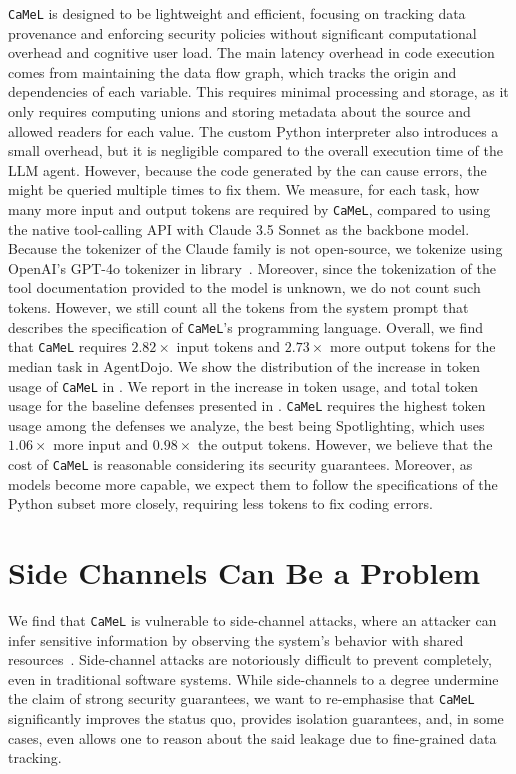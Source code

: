 \documentclass[11pt, a4paper, logo, copyright]{googledeepmind}
\newcommand{\sysname}{\texttt{CaMeL}\xspace}
\begin{document}
\sysname{} is designed to be lightweight and efficient, focusing on tracking data provenance and enforcing security policies without significant computational overhead and cognitive user load. The main latency overhead in code execution comes from maintaining the data flow graph, which tracks the origin and dependencies of each variable. This requires minimal processing and storage, as it only requires computing unions and storing metadata about the source and allowed readers for each value. The custom Python interpreter also introduces a small overhead, but it is negligible compared to the overall execution time of the LLM agent. However, because the code generated by the \pllm can cause errors, the \pllm might be queried multiple times to fix them. We measure, for each task, how many more input and output tokens are required by \sysname, compared to using the native tool-calling API with Claude 3.5 Sonnet as the backbone model. Because the tokenizer of the Claude family is not open-source, we tokenize using OpenAI's GPT-4o tokenizer in  library~\citep{tiktoken2022}.
Moreover, since the tokenization of the tool documentation provided to the model is unknown, we do not count such tokens. However, we still count all the tokens from the system prompt that describes the specification of \sysname's programming language. Overall, we find that \sysname requires $2.82\times$ input tokens and $2.73\times$ more output tokens for the median task in AgentDojo. We show the distribution of the increase in token usage of \sysname in . We report in  the increase in token usage, and total token usage for the baseline defenses presented in .
\sysname requires the highest token usage among the defenses we analyze, the best being Spotlighting, which uses $1.06\times$ more input and $0.98\times$ the output tokens. However, we believe that the cost of \sysname is reasonable considering its security guarantees. Moreover, as models become more capable, we expect them to follow the specifications of the Python subset more closely, requiring less tokens to fix coding errors.

\section{Side Channels Can Be a Problem}
\label{sec:side-channels}

We find that \sysname{} is vulnerable to side-channel attacks, where an attacker can infer sensitive information by observing the system's behavior with shared resources~\citep{anderson2002security}. Side-channel attacks are notoriously difficult to prevent completely, even in traditional software systems. While side-channels to a degree undermine the claim of strong security guarantees, we want to re-emphasise that \sysname{} significantly improves the status quo, provides isolation guarantees, and, in some cases, even allows one to reason about the said leakage due to fine-grained data tracking.
\end{document}
